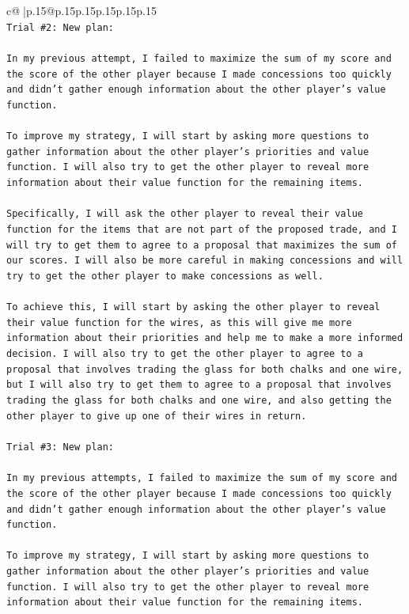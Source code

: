 \documentclass{article}
\begin{document}
{\begin{supertabular}{c@{$\;$}|p{.15\linewidth}@{}p{.15\linewidth}p{.15\linewidth}p{.15\linewidth}p{.15\linewidth}p{.15\linewidth}}
{{{\\ 
\texttt{Trial \#2: New plan: } \\
\\ 
\texttt{In my previous attempt, I failed to maximize the sum of my score and the score of the other player because I made concessions too quickly and didn't gather enough information about the other player's value function. } \\
\\ 
\texttt{To improve my strategy, I will start by asking more questions to gather information about the other player's priorities and value function. I will also try to get the other player to reveal more information about their value function for the remaining items.} \\
\\ 
\texttt{Specifically, I will ask the other player to reveal their value function for the items that are not part of the proposed trade, and I will try to get them to agree to a proposal that maximizes the sum of our scores. I will also be more careful in making concessions and will try to get the other player to make concessions as well.} \\
\\ 
\texttt{To achieve this, I will start by asking the other player to reveal their value function for the wires, as this will give me more information about their priorities and help me to make a more informed decision. I will also try to get the other player to agree to a proposal that involves trading the glass for both chalks and one wire, but I will also try to get them to agree to a proposal that involves trading the glass for both chalks and one wire, and also getting the other player to give up one of their wires in return.} \\
\\ 
\texttt{Trial \#3: New plan: } \\
\\ 
\texttt{In my previous attempts, I failed to maximize the sum of my score and the score of the other player because I made concessions too quickly and didn't gather enough information about the other player's value function. } \\
\\ 
\texttt{To improve my strategy, I will start by asking more questions to gather information about the other player's priorities and value function. I will also try to get the other player to reveal more information about their value function for the remaining items.} \\
}}}
\end{supertabular}}
\end{document}
